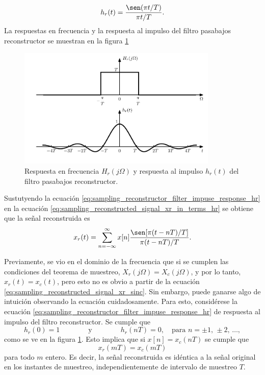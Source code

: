 \documentclass[a4paper]{report}
\begin{document}
\begin{equation}\label{eq:sampling_reconstructor_filter_impuse_response_hr}
 h_r(t)=\frac{\sen(\pi t/T)}{\pi t/T}. 
\end{equation}
La respuestas en frecuencia y la respuesta al impulso del filtro pasabajos reconstructor se muestran en la figura \ref{fig:sampling_lowpass_continuous_inverse_fourier_transform_2}
\begin{figure}[!htb]
 \begin{center}
 \includegraphics[width=0.85\textwidth]{figuras/sampling_lowpass_continuous_inverse_fourier_transform_2.pdf}
 \caption{\label{fig:sampling_lowpass_continuous_inverse_fourier_transform_2} Respuesta en frecuencia \(H_r(j\Omega)\) y respuesta al impulso \(h_r(t)\) del filtro pasabajos reconstructor.}
 \end{center}
\end{figure}
Sustutyendo la ecuación \ref{eq:sampling_reconstructor_filter_impuse_response_hr} en la ecuación \ref{eq:sampling_reconstructed_signal_xr_in_terms_hr} se obtiene que la señal reconstruida es
\begin{equation}\label{eq:sampling_reconstructed_signal_xr_sinc}
 x_r(t)=\sum_{n=-\infty}^\infty x[n]\frac{\sen[\pi(t-nT)/T]}{\pi(t-nT)/T}.
\end{equation}

Previamente, se vio en el dominio de la frecuencia que si se cumplen las condiciones del teorema de muestreo, \(X_r(j\Omega)=X_c(j\Omega)\), y por lo tanto, \(x_r(t)=x_c(t)\), pero esto no es obvio a partir de la ecuación \ref{eq:sampling_reconstructed_signal_xr_sinc}. Sin embargo, puede ganarse algo de intuición observando la ecuación cuidadosamente. Para esto, considérese la ecuación \ref{eq:sampling_reconstructor_filter_impuse_response_hr} de respuesta al impulso del filtro reconstructor. Se cumple que
\[
h_r(0)=1\qquad\qquad\textrm{y}\qquad\qquad h_r(nT)=0,\quad\textrm{para } n=\pm1,\,\pm2,\,\dots,
\]
como se ve en la figura \ref{fig:sampling_lowpass_continuous_inverse_fourier_transform_2}. Esto implica que si \(x[n]=x_c(nT)\) se cumple que 
\[
 x_r(mT)=x_c(mT)
\]
para todo \(m\) entero. Es decir, la señal reconstruida es idéntica a la señal original en los instantes de muestreo, independientemente de intervalo de muestreo \(T\). 
\end{document}
